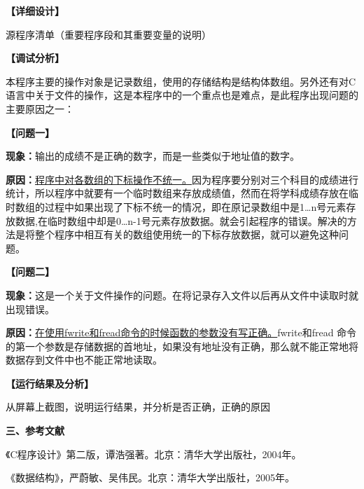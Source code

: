 \documentclass[11pt,a4paper]{article}
\newcommand{\reportsection}[1]{%
  \vspace{0.35\baselineskip}
  {\noindent\fontsize{12pt}{18pt}\selectfont\bfseries #1\par}
  \vspace{0.2\baselineskip}
}
\newcommand{\labelpara}[1]{\noindent\textbf{#1}\par}
\begin{document}
\labelpara{【详细设计】}
\noindent\hspace*{2em}源程序清单（重要程序段和其重要变量的说明）

\labelpara{【调试分析】}
本程序主要的操作对象是记录数组，使用的存储结构是结构体数组。另外还有对C语言中关于文件的操作，这是本程序中的一个重点也是难点，是此程序出现问题的主要原因之一：

\labelpara{【问题一】}
\noindent\textbf{现象：}输出的成绩不是正确的数字，而是一些类似于地址值的数字。

\noindent\textbf{原因：}\uline{程序中对各数组的下标操作不统一。}因为程序要分别对三个科目的成绩进行统计，所以程序中就要有一个临时数组来存放成绩值，然而在将学科成绩存放在临时数组的过程中如果出现了下标不统一的情况，即在原记录数组中是1…n号元素存放数据,在临时数组中却是0…n-1号元素存放数据。就会引起程序的错误。解决的方法是将整个程序中相互有关的数组使用统一的下标存放数据，就可以避免这种问题。

\labelpara{【问题二】}
\noindent\textbf{现象：}这是一个关于文件操作的问题。在将记录存入文件以后再从文件中读取时就出现错误。

\noindent\textbf{原因：}\uline{在使用fwrite和fread命令的时候函数的参数没有写正确。}fwrite和fread 命令的第一个参数是存储数据的首地址，如果没有地址没有正确，那么就不能正常地将数据存到文件中也不能正常地读取。

\labelpara{【运行结果及分析】}
\noindent\hspace*{2em}从屏幕上截图，说明运行结果，并分析是否正确，正确的原因

\reportsection{三、参考文献}
\noindent[1]《C程序设计》第二版，谭浩强著。北京：清华大学出版社，2004年。

\noindent[2]《数据结构》，严蔚敏、吴伟民。北京：清华大学出版社，2005年。
\end{document}
